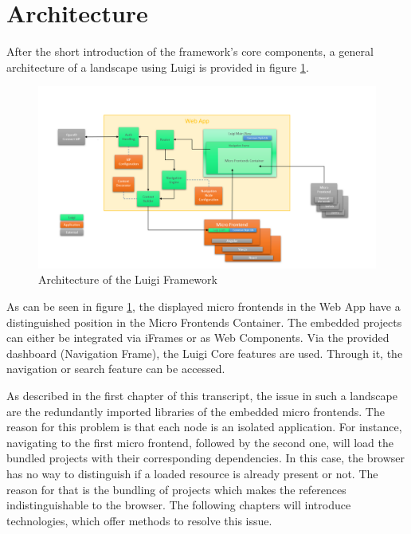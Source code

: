 \section{Architecture}

After the short introduction of the framework's core components, a general architecture of a landscape using Luigi is provided in figure \ref{fig:luigi_architecture_fig}.

\begin{figure}[!h]
	\centering
	\includegraphics[width=1.05\textwidth]{Figures/Luigi_Architektur.png}
	\caption{Architecture of the Luigi Framework \cite{luigi_architecture}}
	\label{fig:luigi_architecture_fig}
\end{figure}

As can be seen in figure \ref{fig:luigi_architecture_fig}, the displayed micro frontends in the Web App have a distinguished position in the Micro Frontends Container. The embedded projects can either be integrated via iFrames or as Web Components.
Via the provided dashboard (Navigation Frame), the Luigi Core features are used. Through it, the navigation or search feature can be accessed.

As described in the first chapter of this transcript, the issue in such a landscape are the redundantly imported libraries of the embedded micro frontends. The reason for this problem is that each node is an isolated application.
For instance, navigating to the first micro frontend, followed by the second one, will load the bundled projects with their corresponding dependencies. In this case, the browser has no way to distinguish if a loaded resource is already present or not. The reason for that is the bundling of projects which makes the references indistinguishable to the browser.
The following chapters will introduce technologies, which offer methods to resolve this issue. 
 
